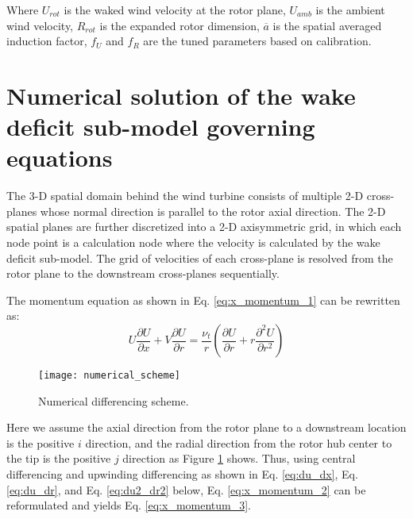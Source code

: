 \documentclass{umthesis}
\begin{document}
Where $U_{rot}$ is the waked wind velocity at the rotor plane, $U_{amb}$ is the ambient wind velocity, $R_{rot}$ is the expanded rotor dimension, $\overline{a}$ is the spatial averaged induction factor, $f_U$ and $f_R$ are the tuned parameters based on calibration.


\section{Numerical solution of the wake deficit sub-model governing equations} \label{sec:numerical solution}
The 3-D spatial domain behind the wind turbine consists of multiple 2-D cross-planes whose normal direction is parallel to the rotor axial direction. The 2-D spatial planes are further discretized into a 2-D axisymmetric grid, in which each node point is a calculation node where the velocity is calculated by the wake deficit sub-model. The grid of velocities of each cross-plane is resolved from the rotor plane to the downstream cross-planes sequentially.

The momentum equation as shown in Eq. \ref{eq:x_momentum_1} can be rewritten as:
\begin{equation}\label{eq:x_momentum_2}
  U\frac{\partial U}{\partial x}+V\frac{\partial U}{\partial r}=\frac{\nu_t}{r}(\frac{\partial U}{\partial r}+r\frac{\partial^2 U}{\partial r^2})
\end{equation}

\begin{figure}
  \centering
  \texttt{[image: numerical\_scheme]}
  \caption{Numerical differencing scheme.}\label{fig:numerical_scheme}
\end{figure}


Here we assume the axial direction from the rotor plane to a downstream location is the positive $i$ direction, and the radial direction from the rotor hub center to the tip is the positive $j$ direction as Figure \ref{fig:numerical_scheme} shows. Thus, using central differencing and upwinding differencing as shown in Eq. \ref{eq:du_dx}, Eq. \ref{eq:du_dr}, and Eq. \ref{eq:du2_dr2} below,
Eq. \ref{eq:x_momentum_2} can be reformulated and yields Eq. \ref{eq:x_momentum_3}.
\end{document}
